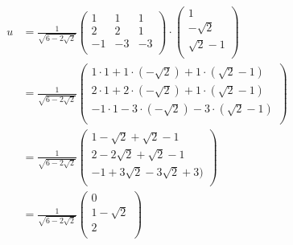 \documentclass[tikz,14pt,fleqn]{article}
\begin{document}
\begin{align*}
u &= \frac{1}{\sqrt{6-2\sqrt{2}}}\begin{pmatrix}
1 & 1 & 1 \\
2 & 2 & 1 \\
-1 & -3 & -3 \\
\end{pmatrix} 
\cdot
\begin{pmatrix}
1 \\
-\sqrt{2} \\
\sqrt{2}-1 \\
\end{pmatrix} \\
&=
\frac{1}{\sqrt{6-2\sqrt{2}}} 
\begin{pmatrix}
1 \cdot 1 + 1 \cdot (-\sqrt{2}) + 1 \cdot (\sqrt{2}-1) \\
2 \cdot 1 + 2 \cdot (-\sqrt{2}) + 1 \cdot (\sqrt{2}-1) \\
-1 \cdot 1 -3 \cdot (-\sqrt{2}) -3 \cdot (\sqrt{2}-1) \\
\end{pmatrix} \\
&=
\frac{1}{\sqrt{6-2\sqrt{2}}}
\begin{pmatrix}
1 -\sqrt{2} + \sqrt{2}-1 \\
2 -2\sqrt{2} + \sqrt{2}-1 \\
-1 +3\sqrt{2} -3\sqrt{2} +3) \\
\end{pmatrix} \\
&=
\frac{1}{\sqrt{6-2\sqrt{2}}}
\begin{pmatrix}
0 \\
1 - \sqrt{2} \\
2 \\
\end{pmatrix}
\end{align*}
\end{document}
